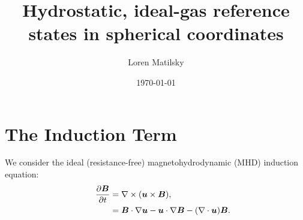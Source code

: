 \documentclass[12pt]{article}
\date{\today}
\author{Loren Matilsky}
\title{Hydrostatic, ideal-gas reference states in spherical coordinates}
\begin{document}
\maketitle

\section{The Induction Term}
We consider the ideal (resistance-free) magnetohydrodynamic (MHD) induction equation:
\begin{align}
	\ \ \ \ \ \frac{\partial\bm{B}}{\partial t} &= \nabla\times(\bm{u}\times\bm{B}) \label{eq:ind1},\\
	&= \bm{B}\cdot\nabla\bm{u} - \bm{u}\cdot\nabla\bm{B} -(\nabla\cdot\bm{u})\bm{B}. \label{eq:ind2}
\end{align}
\end{document}
